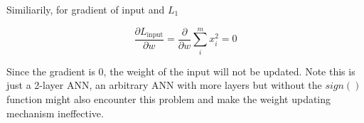 \documentclass[12pt]{article}
\newcommand{\p}{\partial}
\begin{document}
Similiarily, for gradient of input and $L_1$

\begin{equation*}
    \frac{\p L_{\text{input}}}{\p w} = \frac{\p}{\p w} \sum_{i}^{m} x_i^2 = 0
\end{equation*}

Since the gradient is 0, the weight of the input will not be updated. Note this is just a 2-layer ANN, an arbitrary ANN with more layers but without the $sign()$ function might also encounter this problem and make the weight updating mechanism ineffective.


% 
% 
\end{document}
